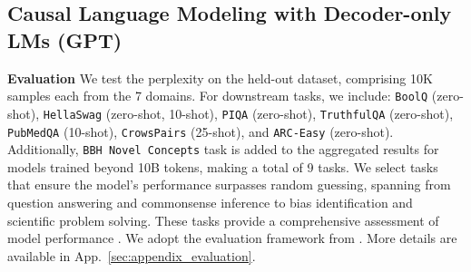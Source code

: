 \documentclass{article} %
\begin{document}







\subsection{Causal Language Modeling with Decoder-only LMs (GPT)}
\label{sec:exp-gpt}

\textbf{Evaluation}
We test the perplexity on the held-out dataset, comprising 10K samples each from the 7 domains. For downstream tasks, we include: \texttt{BoolQ} \citep{clark2019boolq} (zero-shot), \texttt{HellaSwag} \citep{zellers2019hellaswag} (zero-shot, 10-shot), \texttt{PIQA} \citep{bisk2020piqa} (zero-shot), \texttt{TruthfulQA} \citep{lin2021truthfulqa} (zero-shot), \texttt{PubMedQA} \citep{jin2019pubmedqa} (10-shot), \texttt{CrowsPairs} \citep{nangia2020crows} (25-shot), and \texttt{ARC-Easy} \citep{clark2018think} (zero-shot). Additionally, \texttt{BBH Novel Concepts} \citep{srivastava2022beyond} task is added to the aggregated results for models trained beyond 10B tokens, making a total of 9 tasks. We select tasks that ensure the model's performance surpasses random guessing, spanning from question answering and commonsense inference to bias identification and scientific problem solving. These tasks provide a comprehensive assessment of model performance \citep{mehta2024openelm,gadre2024language}.
We adopt the evaluation framework from \citep{gao2021framework}.  More details are available in App.~\ref{sec:appendix_evaluation}.
\end{document}
